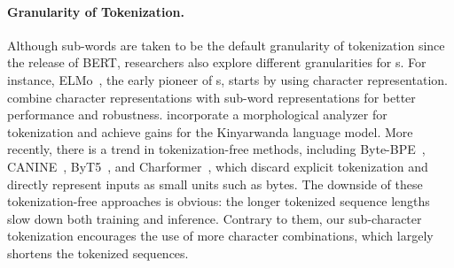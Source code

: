 \paragraph{Granularity of Tokenization.} Although sub-words are taken to be the default granularity of tokenization since the release of BERT, researchers also explore different granularities for \plm{}s. For instance, ELMo~\cite{ELMo}, the early pioneer of \plm{}s, starts by using character representation. \citet{CharBERT} combine character representations with sub-word representations for better performance and robustness. 
\citet{Nzeyimana2022KinyaBERTAM} incorporate a morphological analyzer for tokenization and achieve gains for the Kinyarwanda language model. 
More recently, there is a trend in tokenization-free methods, including Byte-BPE~\cite{BBPE}, CANINE~\cite{CANINE}, ByT5~\cite{ByT5}, and Charformer~\cite{Charformer}, which discard explicit tokenization and directly represent inputs as small units such as bytes. The downside of these tokenization-free approaches is obvious: the longer tokenized sequence lengths slow down both training and inference. Contrary to them, our sub-character tokenization encourages the use of more character combinations, which largely shortens the tokenized sequences. 

